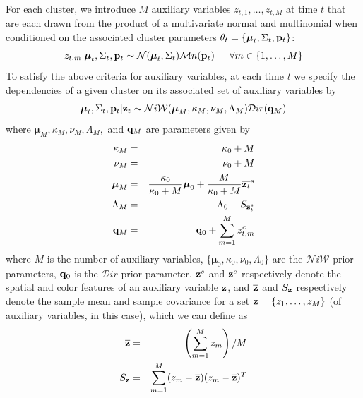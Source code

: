 \documentclass[smallcondensed, final]{svjour3}
\begin{document}
For each cluster, we introduce $M$ auxiliary variables $z_{t, 1}, \ldots, z_{t, M}$ at time $t$ that are each drawn from the product of a multivariate normal and multinomial when conditioned on the associated cluster parameters $\theta_{t} = \{ \boldsymbol{\mu}_{t}, \Sigma_{t}, \bold{p}_{t} \}$:
\begin{equation}
\label{transker1}
z_{t, m} | \boldsymbol{\mu}_{t}, \Sigma_{t}, \bold{p}_{t}  \sim  \mathcal{N}(\boldsymbol{\mu}_{t}, \Sigma_{t}) \mathcal{M}n(\bold{p}_{t})   \hspace{15pt}   
\forall m \in \{ 1, \ldots, M \}
\end{equation}
To satisfy the above criteria for auxiliary variables, at each time $t$ we specify the dependencies of a given cluster on its associated set of auxiliary variables by
\begin{equation}
\label{transker2}
\boldsymbol{\mu}_{t}, \Sigma_{t}, \bold{p}_{t} | \bold{z}_t  \sim  \mathcal{N}i\mathcal{W}(\boldsymbol{\mu}_{M}, \kappa_{M}, \nu_{M}, \Lambda_{M})  \mathcal{D}ir(\bold{q}_{M})
\end{equation}
where $\boldsymbol{\mu}_{M}, \kappa_{M}, \nu_{M}, \Lambda_{M},$ and $\bold{q}_{M}$ are parameters given by
\begin{eqnarray}
\kappa_{M} &=& \kappa_{0} + M \\
\nu_{M} &=& \nu_{0} + M \\
\boldsymbol{\mu}_{M} &=& \frac{\kappa_{0}}{\kappa_{0}+M} \boldsymbol{\mu}_{0}  +  \frac{M}{\kappa_{0}+M} \overline{\bold{z}_t}^{s}\\
\Lambda_{M} &=& \Lambda_{0} + S_{\bold{z}_{t}^{s}}\\
\bold{q}_{M} &=& \bold{q}_{0} + \sum_{m=1}^{M} z_{t,m}^{c}
\end{eqnarray}
where $M$ is the number of auxiliary variables, $\{ \boldsymbol{\mu}_{0}, \kappa_{0}, \nu_{0}, \Lambda_{0} \}$ are the $\mathcal{N}i\mathcal{W}$ prior parameters, $\bold{q}_{0}$ is the $\mathcal{D}ir$ prior parameter, $\bold{z}^{s}$ and $\bold{z}^{c}$ respectively denote the spatial and color features of an auxiliary variable $\bold{z}$, and $\overline{\bold{z}}$ and $S_{\bold{z}}$ respectively denote the sample mean and sample covariance for a set $\bold{z} = \{ z_{1}, \ldots, z_{M} \}$ (of auxiliary variables, in this case), which we can define as
\begin{eqnarray}
\label{samplemean}
\overline{\bold{z}}  &=&  \left( \sum_{m=1}^{M} z_{m} \right) / M\\
\label{samplecov}
S_{\bold{z}}  &=&  \sum_{m=1}^{M} (z_{m} - \overline{\bold{z}}) (z_{m} - \overline{\bold{z}})^{T}
\end{eqnarray}
\end{document}
